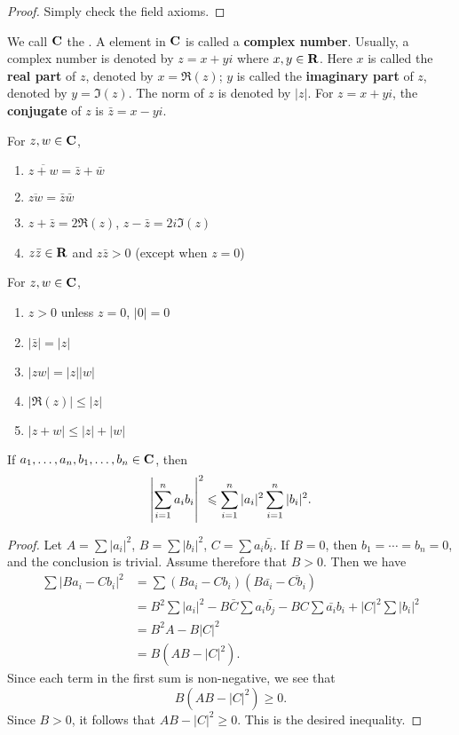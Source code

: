 \begin{proof}
Simply check the field axioms.
\end{proof}

We call $\mathbf C$ the . A element in $\mathbf C$ is called a \textbf{complex number}. Usually, a complex number is denoted by $z=x+yi$ where $x,y\in\mathbf R$. Here $x$ is called the \textbf{real part} of $z$, denoted by $x=\Re(z)$; $y$ is called the \textbf{imaginary part} of $z$, denoted by $y=\Im(z)$. The norm of $z$ is denoted by $|z|$. For $z=x+yi$, the \textbf{conjugate} of $z$ is $\bar{z}=x-yi$.

\begin{proposition}
For $z,w\in\mathbf C$,
\begin{enumerate}[label=(\arabic*)]
\item $\overline{z+w}=\bar{z}+\bar{w}$
\item $\overline{zw}=\bar{z}\bar{w}$
\item $z+\bar{z}=2\Re(z)$, $z-\bar{z}=2i\Im(z)$
\item $z\bar{z}\in\mathbf R$ and $z\bar{z}>0$ (except when $z=0$)
\end{enumerate}
\end{proposition}

\begin{proposition}
For $z,w\in\mathbf C$,
\begin{enumerate}[label=(\arabic*)]
\item $z>0$ unless $z=0$, $|0|=0$
\item $|\bar{z}|=|z|$
\item $|zw|=|z||w|$
\item $|\Re(z)|\le|z|$
\item $|z+w|\le|z|+|w|$
\end{enumerate}
\end{proposition}

\begin{theorem}
If $a_1,\dots,a_n,b_1,\dots,b_n\in\mathbf C$, then
\begin{equation}
\left|\sum_{i=1}^{n}a_ib_i\right|^2\leqslant\sum_{i=1}^{n}|a_i|^2\sum_{i=1}^{n}|b_i|^2.
\end{equation}
\end{theorem}

\begin{proof}
Let $A=\sum|a_i|^2$, $B=\sum|b_i|^2$, $C=\sum a_i\bar{b_i}$. If $B=0$, then $b_1=\cdots=b_n=0$, and the conclusion is trivial. Assume therefore that $B>0$. Then we have
\begin{align*}
\sum|Ba_i-Cb_i|^2
&=\sum(Ba_i-Cb_i)(B\bar{a_i}-\overline{Cb_i})\\
&=B^2\sum|a_i|^2-B\bar{C}\sum a_i\bar{b_j}-BC\sum\bar{a_i}b_i+|C|^2\sum|b_i|^2\\
&=B^2A-B|C|^2\\
&=B(AB-|C|^2).
\end{align*}
Since each term in the first sum is non-negative, we see that
\[B(AB-|C|^2)\ge0.\]
Since $B>0$, it follows that $AB-|C|^2\ge0$. This is the desired inequality.
\end{proof}

